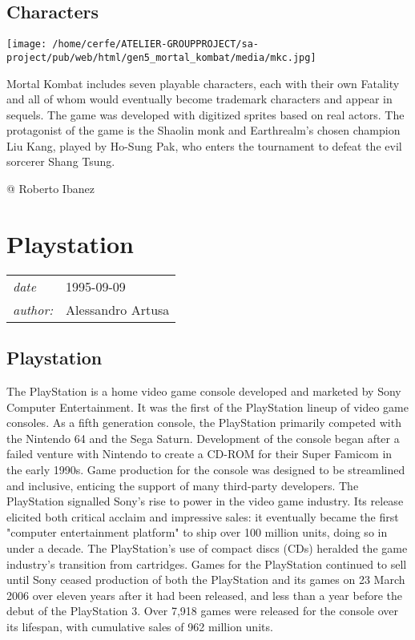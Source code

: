 \documentclass[a4paper,10pt]{book}
\newcommand{\pageHeader}[4]{
    \section{#1}
    \vspace{-0.3cm}
    \begin{table}[h!]
     \begin{tabular}{ll}
        \hline
        \textit{date} & #2 \\
        \textit{author: } & #3\\
        \hline
     \end{tabular}
    \end{table}
    \vspace{-0.3cm}
}
\begin{document}
 \subsection{Characters }
 \texttt{[image: /home/cerfe/ATELIER-GROUPPROJECT/sa-project/pub/web/html/gen5\_mortal\_kombat/media/mkc.jpg]}
 
            Mortal Kombat includes seven playable characters, each with their own Fatality and all of whom would eventually become trademark characters and appear in sequels. 
            The game was developed with digitized sprites based on real actors. 
            The protagonist of the game is the Shaolin monk and Earthrealm's chosen champion Liu Kang, played by Ho-Sung Pak, who enters the tournament to defeat the evil sorcerer Shang Tsung.
         
 
 @ Roberto Ibanez 
 
 \newpage\pageHeader{Playstation}{1995-09-09}{Alessandro Artusa}{Page about Sony home video game console Playstation}
 \subsection{Playstation }
 
          The PlayStation is a home video game console developed and marketed by Sony Computer Entertainment. 
          It was the first of the PlayStation lineup of video game consoles. As a fifth generation console, the PlayStation primarily competed with the Nintendo 64 and the Sega Saturn.
          Development of the console began after a failed venture with Nintendo to create a CD-ROM for their Super Famicom in the early 1990s. Game production for the console was designed to be streamlined and inclusive, enticing the support of many third-party developers.  
          The PlayStation signalled Sony's rise to power in the video game industry. Its release elicited both critical acclaim and impressive sales: it eventually became the first "computer entertainment platform" to ship over 100 million units, doing so in under a decade. 
          The PlayStation's use of compact discs (CDs) heralded the game industry's transition from cartridges. Games for the PlayStation continued to sell until Sony ceased production of both the PlayStation and its games on 23 March 2006  over eleven years after it had been released, and less than a year before the debut of the PlayStation 3.
          Over 7,918 games were released for the console over its lifespan, with cumulative sales of 962 million units.
       
\end{document}
